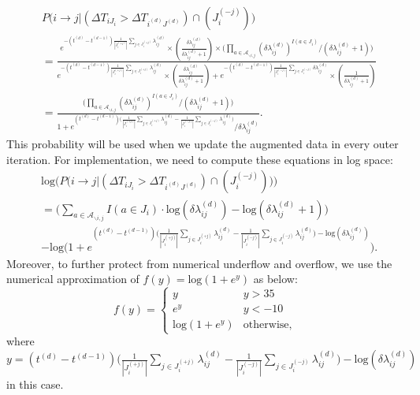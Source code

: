 \documentclass[a4paper]{article}
\begin{document}
   \begin{equation}
   	\begin{split}
   		&P\Big(i \rightarrow j|(\Delta T_{i{J_i}} > \Delta T_{i^{(d)}{J^{(d)}}})\cap( J_i^{(-j)})\Big)
   		\\&=\frac{e^{-(t^{(d)}-t^{(d-1)})\frac{1}{|J_i^{(+j)}|}\sum\limits_{j \in J_i^{(+j)}}\lambda^{(d)}_{ij}}\times(\frac{\delta\lambda^{(d)}_{ij}}{\delta\lambda^{(d)}_{ij}+1})\times\Big(\prod_{a \in \mathcal{A}_{\backslash i, j}} {(\delta\lambda^{(d)}_{ij})}^{I(a \in J_i)} / (\delta\lambda^{(d)}_{ij}+1)\Big)}{e^{-(t^{(d)}-t^{(d-1)})\frac{1}{|J_i^{(+j)}|}\sum\limits_{j \in J_i^{(+j)}}\lambda^{(d)}_{ij}}\times(\frac{\delta\lambda^{(d)}_{ij}}{\delta\lambda^{(d)}_{ij}+1})+e^{-(t^{(d)}-t^{(d-1)})\frac{1}{|J_i^{(-j)}|}\sum\limits_{j \in J_i^{(-j)}}\delta\lambda^{(d)}_{ij}}\times(\frac{1}{\delta\lambda^{(d)}_{ij}+1})}
\\&=\frac{\Big(\prod_{a \in \mathcal{A}_{\backslash i, j}} {(\delta\lambda^{(d)}_{ij})}^{I(a \in J_i)} / (\delta\lambda^{(d)}_{ij}+1)\Big)}{1 + e^{(t^{(d)}-t^{(d-1)})\big(\frac{1}{|J_i^{(+j)}|}\sum\limits_{j \in J_i^{(+j)}}\lambda^{(d)}_{ij} -\frac{1}{|J_i^{(-j)}|}\sum\limits_{j \in J_i^{(-j)}}\lambda^{(d)}_{ij} \big)} / \delta\lambda^{(d)}_{ij}}.   	\end{split}
   \end{equation}
  This probability will be used when we update the augmented data in every outer iteration. For implementation, we need to compute these equations in log space:
  \begin{equation}
  \begin{aligned}
  &\mbox{log}\Big(P\Big(i\to j|(\Delta T_{i{J_i}} > \Delta T_{i^{(d)}{J^{(d)}}})\cap( J_i^{(-j)})\Big)\Big)\\&=\Big(\sum_{a \in \mathcal{A}_{\backslash i, j}} {{I(a \in J_i)}\cdot \mbox{log}(\delta\lambda^{(d)}_{ij})}- \mbox{log}(\delta\lambda^{(d)}_{ij}+1)\Big)\\&-\mbox{log}\Big(1 + e^{(t^{(d)}-t^{(d-1)})\big(\frac{1}{|J_i^{(+j)}|}\sum\limits_{j \in J_i^{(+j)}}\lambda^{(d)}_{ij} -\frac{1}{|J_i^{(-j)}|}\sum\limits_{j \in J_i^{(-j)}}\lambda^{(d)}_{ij} \big) - \mbox{log}(\delta\lambda^{(d)}_{ij})} \Big).   
  \end{aligned}
  \end{equation}
  Moreover, to further protect from numerical underflow and overflow, we use the numerical approximation of $f(y) = \mbox{log}(1+ e^y)$ as below: 
  \begin{equation*}
  f(y) = \begin{cases}
  y &y >35\\
  e^y & y<-10\\
  \mbox{log}(1+e^y) & \mbox{otherwise},
  \end{cases}
  \end{equation*}
  where $y = (t^{(d)}-t^{(d-1)})\big(\frac{1}{|J_i^{(+j)}|}\sum\limits_{j \in J_i^{(+j)}}\lambda^{(d)}_{ij} -\frac{1}{|J_i^{(-j)}|}\sum\limits_{j \in J_i^{(-j)}}\lambda^{(d)}_{ij} \big) - \mbox{log}(\delta\lambda^{(d)}_{ij})$ in this case.
  \fi
\end{document}
